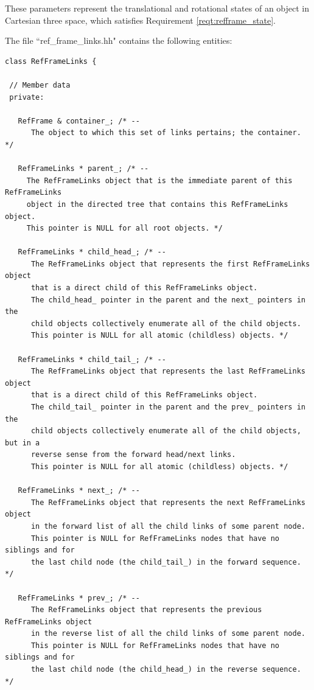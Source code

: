 These parameters represent the translational and rotational states of an
object in Cartesian three space, which satisfies Requirement
\ref{reqt:refframe_state}.

\label{inspect:refframe_struct}

The file ``ref\_frame\_links.hh" contains the following entities:

\begin{verbatim}
class RefFrameLinks {

 // Member data
 private:

   RefFrame & container_; /* --
      The object to which this set of links pertains; the container. */

   RefFrameLinks * parent_; /* --
     The RefFrameLinks object that is the immediate parent of this RefFrameLinks
     object in the directed tree that contains this RefFrameLinks object.
     This pointer is NULL for all root objects. */

   RefFrameLinks * child_head_; /* --
      The RefFrameLinks object that represents the first RefFrameLinks object
      that is a direct child of this RefFrameLinks object.
      The child_head_ pointer in the parent and the next_ pointers in the
      child objects collectively enumerate all of the child objects.
      This pointer is NULL for all atomic (childless) objects. */

   RefFrameLinks * child_tail_; /* --
      The RefFrameLinks object that represents the last RefFrameLinks object
      that is a direct child of this RefFrameLinks object.
      The child_tail_ pointer in the parent and the prev_ pointers in the
      child objects collectively enumerate all of the child objects, but in a
      reverse sense from the forward head/next links.
      This pointer is NULL for all atomic (childless) objects. */

   RefFrameLinks * next_; /* --
      The RefFrameLinks object that represents the next RefFrameLinks object
      in the forward list of all the child links of some parent node.
      This pointer is NULL for RefFrameLinks nodes that have no siblings and for
      the last child node (the child_tail_) in the forward sequence. */

   RefFrameLinks * prev_; /* --
      The RefFrameLinks object that represents the previous RefFrameLinks object
      in the reverse list of all the child links of some parent node.
      This pointer is NULL for RefFrameLinks nodes that have no siblings and for
      the last child node (the child_head_) in the reverse sequence. */


\end{verbatim}

